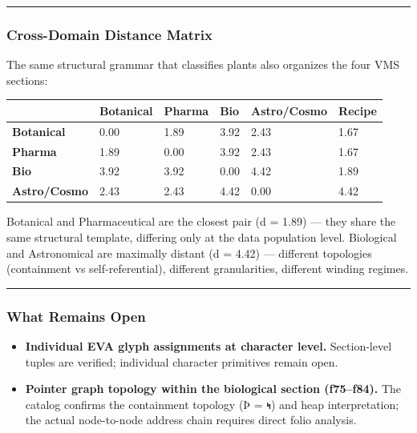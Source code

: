 \documentclass[12pt,a4paper]{article}
\begin{document}
\begin{center}\rule{0.5\linewidth}{0.5pt}\end{center}

\hypertarget{cross-domain-distance-matrix}{%
\subsubsection{Cross-Domain Distance
Matrix}\label{cross-domain-distance-matrix}}

The same structural grammar that classifies plants also organizes the
four VMS sections:

\begin{longtable}[]{@{}llllll@{}}
\toprule
& \textbf{Botanical} & \textbf{Pharma} & \textbf{Bio} &
\textbf{Astro/Cosmo} & \textbf{Recipe}\tabularnewline
\midrule
\endhead
\textbf{Botanical} & 0.00 & 1.89 & 3.92 & 2.43 & 1.67\tabularnewline
\textbf{Pharma} & 1.89 & 0.00 & 3.92 & 2.43 & 1.67\tabularnewline
\textbf{Bio} & 3.92 & 3.92 & 0.00 & 4.42 & 1.89\tabularnewline
\textbf{Astro/Cosmo} & 2.43 & 2.43 & 4.42 & 0.00 & 4.42\tabularnewline
\bottomrule
\end{longtable}

Botanical and Pharmaceutical are the closest pair (d = 1.89) --- they
share the same structural template, differing only at the data
population level. Biological and Astronomical are maximally distant (d =
4.42) --- different topologies (containment vs self-referential),
different granularities, different winding regimes.

\begin{center}\rule{0.5\linewidth}{0.5pt}\end{center}

\hypertarget{what-remains-open}{%
\subsubsection{What Remains Open}\label{what-remains-open}}

\begin{itemize}
\tightlist
\item
  \textbf{Individual EVA glyph assignments at character level.}
  Section-level tuples are verified; individual character primitives
  remain open.
\item
  \textbf{Pointer graph topology within the biological section
  (f75--f84).} The catalog confirms the containment topology (Þ = 𐑰) and
  heap interpretation; the actual node-to-node address chain requires
  direct folio analysis.
\end{itemize}
\end{document}
